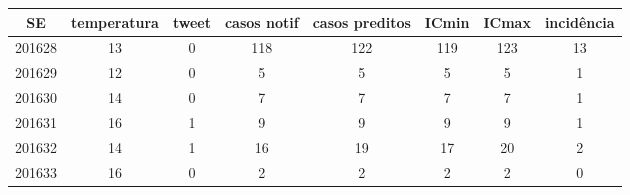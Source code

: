 \begin{tabular}{c|ccccccc}
  \hline
SE & temperatura & tweet & casos notif & casos preditos & ICmin & ICmax & incidência \\ 
  \hline
201628 & 13 & 0 & 118 & 122 & 119 & 123 & 13 \\ 
  201629 & 12 & 0 & 5 & 5 & 5 & 5 & 1 \\ 
  201630 & 14 & 0 & 7 & 7 & 7 & 7 & 1 \\ 
  201631 & 16 & 1 & 9 & 9 & 9 & 9 & 1 \\ 
  201632 & 14 & 1 & 16 & 19 & 17 & 20 & 2 \\ 
  201633 & 16 & 0 & 2 & 2 & 2 & 2 & 0 \\ 
   \hline
\end{tabular}
